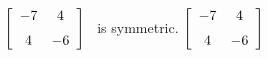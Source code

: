 {$\left[ \begin {array}{cc} -7&4\\\noalign{\medskip}4&-6\end {array}
 \right]$ }
{\tta\ is symmetric. $\left[ \begin {array}{cc} -7&4\\\noalign{\medskip}4&-6\end {array}
 \right]$ }



